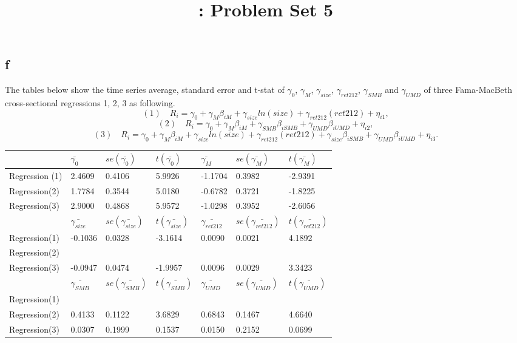 \documentclass{report}
\title{\LectureTitle: Problem Set 5}
\begin{document}
\maketitle
\newpage

\subsection{f}
The tables below show the time series average, standard error and t-stat of $\gamma_{0}$, $\gamma_{M}$, $\gamma_{size}$, $\gamma_{ret212}$, $\gamma_{SMB}$ and $\gamma_{UMD}$ of three Fama-MacBeth cross-sectional regressions 1, 2, 3 as following.
\[ (1) \quad R_{i} = \gamma_{0}+\gamma_{M}\beta_{iM}+\gamma_{size}ln(size)+\gamma_{ret212}(ret212)+\eta_{i1}, \]
\[ (2) \quad R_{i} = \gamma_{0}+\gamma_{M}\beta_{iM}+\gamma_{SMB}\beta_{iSMB}+\gamma_{UMD}\beta_{iUMD}+\eta_{i2}, \]
\[ (3) \quad R_{i} = \gamma_{0}+\gamma_{M}\beta_{iM}+\gamma_{size}ln(size)+\gamma_{ret212}(ret212)+\gamma_{size}\beta_{iSMB}+\gamma_{UMD}\beta_{iUMD}+\eta_{i3}. \]

\begin{table}[H]
\centering
\begin{tabular}{|l|l|l|l|l|l|l|}
\hline
               & $\bar{\gamma_{0}}$    &  $se(\bar{\gamma_{0}})$   & $t(\bar{\gamma_{0}})$  & $\bar{\gamma_{M}}$     & $se(\bar{\gamma_{M}})$    & $t(\bar{\gamma_{M}})$   \\ \hline
Regression (1) & 2.4609  & 0.4106 & 5.9926  & -1.1704 & 0.3982 & -2.9391 \\ \hline
Regression(2)  & 1.7784  & 0.3544 & 5.0180  & -0.6782 & 0.3721 & -1.8225 \\ \hline
Regression(3)  & 2.9000  & 0.4868 & 5.9572  & -1.0298 & 0.3952 & -2.6056 \\ \hline
               & $\bar{\gamma_{size}}$    &  $se(\bar{\gamma_{size}})$   & $t(\bar{\gamma_{size}})$  & $\bar{\gamma_{ret212}}$     & $se(\bar{\gamma_{ret212}})$    & $t(\bar{\gamma_{ret212}})$   \\ \hline
Regression(1)  & -0.1036 & 0.0328 & -3.1614 & 0.0090  & 0.0021 & 4.1892  \\ \hline
Regression(2)  &         &        &         &         &        &         \\ \hline
Regression(3)  & -0.0947 & 0.0474 & -1.9957 & 0.0096  & 0.0029 & 3.3423  \\ \hline
               & $\bar{\gamma_{SMB}}$    &  $se(\bar{\gamma_{SMB}})$   & $t(\bar{\gamma_{SMB}})$  & $\bar{\gamma_{UMD}}$     & $se(\bar{\gamma_{UMD}})$    & $t(\bar{\gamma_{UMD}})$   \\ \hline
Regression(1)  &         &        &         &         &        &         \\ \hline
Regression(2)  & 0.4133  & 0.1122 & 3.6829  & 0.6843  & 0.1467 & 4.6640  \\ \hline
Regression(3)  & 0.0307  & 0.1999 & 0.1537  & 0.0150  & 0.2152 & 0.0699  \\ \hline
\end{tabular}
\end{table}
\end{document}
